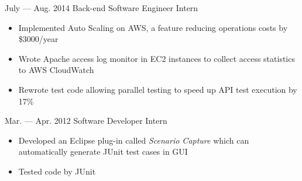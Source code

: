 \documentclass{newresume}
\begin{document}
\begin{body}
	{July --- Aug. 2014}
	{Back-end Software Engineer Intern}
	{}
	\begin{itemize}[noitemsep,topsep=0pt]
		\item Implemented Auto Scaling on AWS, a feature reducing operations costs by \$3000/year
		\item Wrote Apache access log monitor in EC2 instances to collect access statistics to AWS CloudWatch
		\item Rewrote test code allowing parallel testing to speed up API test execution by 17\%
	\end{itemize}
\end{body}

\begin{body}
	{Mar. --- Apr. 2012}
	{Software Developer Intern}
	{}
	\begin{itemize}[noitemsep,topsep=0pt]
		\item Developed an Eclipse plug-in called \textit{Scenario Capture} which can automatically
			  generate JUnit test cases in GUI
		\item Tested code by JUnit
	\end{itemize}
\end{body}
\smallskip

\end{document}
